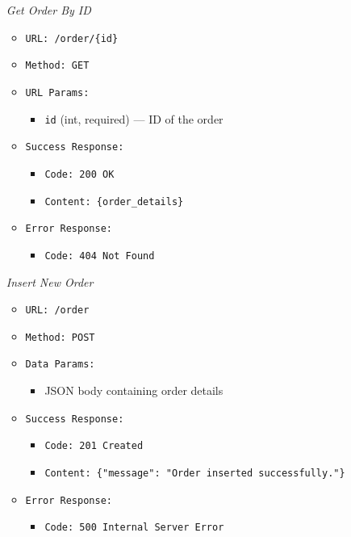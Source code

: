 \begin{itemize}
\begin{itemize}
\begin{itemize}
\begin{itemize}
\item[\textit{Get Order By ID}]
\begin{itemize}
  \item \texttt{URL: /order/\{id\}}
  \item \texttt{Method: GET}
  \item \texttt{URL Params:}
    \begin{itemize}
      \item \texttt{id} (int, required) — ID of the order
    \end{itemize}
  \item \texttt{Success Response:}
    \begin{itemize}
      \item \texttt{Code: 200 OK}
      \item \texttt{Content: \{order\_details\}}
    \end{itemize}
  \item \texttt{Error Response:}
    \begin{itemize}
      \item \texttt{Code: 404 Not Found}
    \end{itemize}
\end{itemize}

\item[\textit{Insert New Order}]
\begin{itemize}
  \item \texttt{URL: /order}
  \item \texttt{Method: POST}
  \item \texttt{Data Params:}
    \begin{itemize}
      \item JSON body containing order details
    \end{itemize}
  \item \texttt{Success Response:}
    \begin{itemize}
      \item \texttt{Code: 201 Created}
      \item \texttt{Content: \{"message": "Order inserted successfully."\}}
    \end{itemize}
  \item \texttt{Error Response:}
    \begin{itemize}
      \item \texttt{Code: 500 Internal Server Error}
    \end{itemize}
\end{itemize}


\end{itemize}
\end{itemize}
\end{itemize}
\end{itemize}
